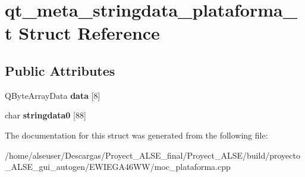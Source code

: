 \hypertarget{structqt__meta__stringdata__plataforma__t}{}\section{qt\+\_\+meta\+\_\+stringdata\+\_\+plataforma\+\_\+t Struct Reference}
\label{structqt__meta__stringdata__plataforma__t}
\subsection*{Public Attributes}
\begin{DoxyCompactItemize}
\item 
\mbox{\label{structqt__meta__stringdata__plataforma__t_a750e6298fb768b251d0b1ba37e969bb5}} 
Q\+Byte\+Array\+Data {\bfseries data} \mbox{[}8\mbox{]}
\item 
\mbox{\label{structqt__meta__stringdata__plataforma__t_a13cb93df2af9ade9b2f2a4b1f9a78d65}} 
char {\bfseries stringdata0} \mbox{[}88\mbox{]}
\end{DoxyCompactItemize}


The documentation for this struct was generated from the following file\+:\begin{DoxyCompactItemize}
\item 
/home/alseuser/\+Descargas/\+Proyect\+\_\+\+A\+L\+S\+E\+\_\+final/\+Proyect\+\_\+\+A\+L\+S\+E/build/proyecto\+\_\+\+A\+L\+S\+E\+\_\+gui\+\_\+autogen/\+E\+W\+I\+E\+G\+A46\+W\+W/moc\+\_\+plataforma.\+cpp\end{DoxyCompactItemize}
